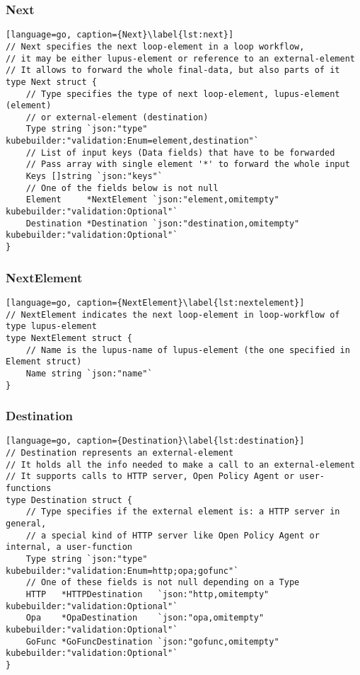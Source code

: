 \subsubsection{Next}
\begin{lstlisting}[language=go, caption={Next}\label{lst:next}]
// Next specifies the next loop-element in a loop workflow, 
// it may be either lupus-element or reference to an external-element
// It allows to forward the whole final-data, but also parts of it
type Next struct {
	// Type specifies the type of next loop-element, lupus-element (element) 
    // or external-element (destination)
	Type string `json:"type" kubebuilder:"validation:Enum=element,destination"`
	// List of input keys (Data fields) that have to be forwarded
	// Pass array with single element '*' to forward the whole input
	Keys []string `json:"keys"`
	// One of the fields below is not null
	Element     *NextElement `json:"element,omitempty" kubebuilder:"validation:Optional"`
	Destination *Destination `json:"destination,omitempty" kubebuilder:"validation:Optional"`
}
\end{lstlisting}

\subsubsection{NextElement}
\begin{lstlisting}[language=go, caption={NextElement}\label{lst:nextelement}]
// NextElement indicates the next loop-element in loop-workflow of type lupus-element
type NextElement struct {
	// Name is the lupus-name of lupus-element (the one specified in Element struct)
	Name string `json:"name"`
}
\end{lstlisting}

\subsubsection{Destination}
\begin{lstlisting}[language=go, caption={Destination}\label{lst:destination}]
// Destination represents an external-element
// It holds all the info needed to make a call to an external-element
// It supports calls to HTTP server, Open Policy Agent or user-functions
type Destination struct {
	// Type specifies if the external element is: a HTTP server in general, 
    // a special kind of HTTP server like Open Policy Agent or internal, a user-function
	Type string `json:"type" kubebuilder:"validation:Enum=http;opa;gofunc"`
	// One of these fields is not null depending on a Type
	HTTP   *HTTPDestination   `json:"http,omitempty" kubebuilder:"validation:Optional"`
	Opa    *OpaDestination    `json:"opa,omitempty" kubebuilder:"validation:Optional"`
	GoFunc *GoFuncDestination `json:"gofunc,omitempty" kubebuilder:"validation:Optional"`
}
\end{lstlisting}

